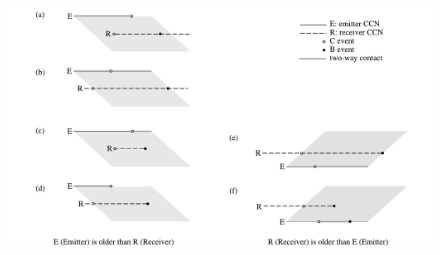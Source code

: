       
  
\begin{figure}
   \centering
   \includegraphics[width=\textwidth]{F_messages.pdf}
    \label{F_messages}
\end{figure}  
 
